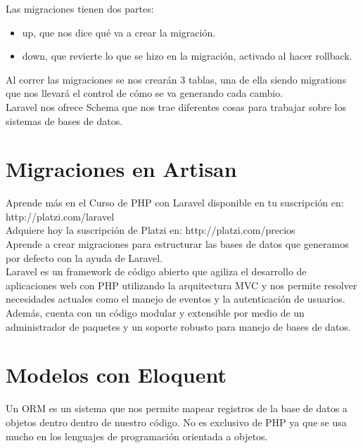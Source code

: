 \documentclass{article}
\begin{document}
Las migraciones tienen dos partes:

\begin{itemize}
  \item up, que nos dice qué va a crear la migración.
  \item down, que revierte lo que se hizo en la migración, activado al hacer
    rollback.
\end{itemize}

Al correr las migraciones se nos crearán 3 tablas, una de ella siendo
migrations que nos llevará el control de cómo se va generando cada cambio.\\

Laravel nos ofrece Schema que nos trae diferentes cosas para trabajar sobre los
sistemas de bases de datos.\\


\section{Migraciones en Artisan}%
Aprende más en el Curso de PHP con Laravel disponible en tu suscripción en:
http://platzi.com/laravel\\

Adquiere hoy la suscripción de Platzi en: http://platzi.com/precios\\

Aprende a crear migraciones para estructurar las bases de datos que generamos
por defecto con la ayuda de Laravel.\\

Laravel es un framework de código abierto que agiliza el desarrollo de
aplicaciones web con PHP utilizando la arquitectura MVC y nos permite resolver
necesidades actuales como el manejo de eventos y la autenticación de usuarios.
Además, cuenta con un código modular y extensible por medio de un administrador
de paquetes y un soporte robusto para manejo de bases de datos.\\

\section{Modelos con Eloquent}%
Un ORM es un sistema que nos permite mapear registros de la base de datos a
objetos dentro dentro de nuestro código. No es exclusivo de PHP ya que se usa
mucho en los lenguajes de programación orientada a objetos.\\
\end{document}

